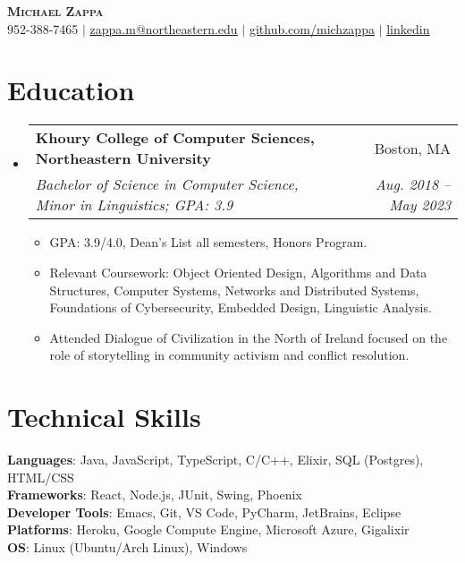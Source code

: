 \documentclass[letterpaper,11pt]{article}
\makeatletter
\newcommand{\resumeItem}[1]{
	\item\small{
		{#1 \vspace{-2pt}}
	}
}
\newcommand{\resumeSubheading}[4]{
	\vspace{-2pt}\item
	\begin{tabular*}{0.97\textwidth}[t]{l@{\extracolsep{\fill}}r}
		\textbf{#1} & #2 \\
		\textit{\small#3} & \textit{\small #4} \\
	\end{tabular*}\vspace{-7pt}
}
\newcommand{\resumeSubHeadingListStart}{\begin{itemize}[leftmargin=0.15in, label={}]}
\newcommand{\resumeSubHeadingListEnd}{\end{itemize}}
\newcommand{\resumeItemListStart}{\begin{itemize}}
\newcommand{\resumeItemListEnd}{\end{itemize}\vspace{-5pt}}
\makeatother
\begin{document}
\begin{center}
	\textbf{\Huge \scshape Michael Zappa} \\ \vspace{1pt}
	\small 952-388-7465 $|$ \href{mailto:zappa.m@northeastern.edu}{\underline{zappa.m@northeastern.edu}} $|$
	\href{https://github.com/michzappa}{\underline{github.com/michzappa}} $|$ \href{https://www.linkedin.com/in/michael-zappa-b01780152/}{\underline{linkedin}}
\end{center}

\section{Education}
\resumeSubHeadingListStart
\resumeSubheading
{Khoury College of Computer Sciences, Northeastern University}{Boston, MA}
{Bachelor of Science in Computer Science, Minor in Linguistics; GPA: 3.9}{Aug. 2018 -- May 2023}
\resumeItemListStart
\resumeItem{GPA: 3.9/4.0, Dean's List all semesters, Honors Program.}
\resumeItem{Relevant Coursework: Object Oriented Design, Algorithms and Data Structures, Computer Systems, Networks and Distributed Systems, Foundations of Cybersecurity, Embedded Design, Linguistic Analysis.}
\resumeItem{Attended Dialogue of Civilization in the North of Ireland focused on the role of storytelling in community activism and conflict resolution.}
\resumeItemListEnd
\resumeSubHeadingListEnd

\section{Technical Skills}
\begin{itemize}[leftmargin=0.15in, label={}]
	\small{\item{
	      \textbf{Languages}{: Java, JavaScript, TypeScript, C/C++, Elixir, SQL (Postgres), HTML/CSS} \\
	      \textbf{Frameworks}{: React, Node.js, JUnit, Swing, Phoenix} \\
	      \textbf{Developer Tools}{: Emacs, Git, VS Code, PyCharm, JetBrains, Eclipse}\\
	      \textbf{Platforms}{: Heroku, Google Compute Engine, Microsoft Azure, Gigalixir}\\
	      \textbf{OS}{: Linux (Ubuntu/Arch Linux), Windows}
	      }}
\end{itemize}
\end{document}
